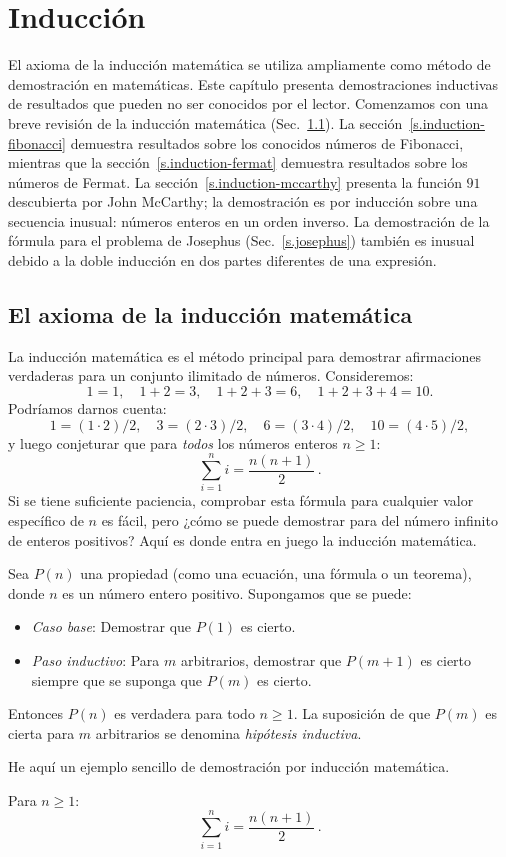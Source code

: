 
\chapter{Inducción}\label{c.induction}


El axioma de la inducción matemática se utiliza ampliamente como método de demostración en matemáticas. Este capítulo presenta demostraciones inductivas de resultados que pueden no ser conocidos por el lector. Comenzamos con una breve revisión de la inducción matemática (Sec.~\ref{s.induction-axiom}). La sección~\ref{s.induction-fibonacci} demuestra resultados sobre los conocidos números de Fibonacci, mientras que la sección~\ref{s.induction-fermat} demuestra resultados sobre los números de Fermat. La sección~\ref{s.induction-mccarthy} presenta la función $91$ descubierta por John McCarthy; la demostración es por inducción sobre una secuencia inusual: números enteros en un orden inverso. La demostración de la fórmula para el problema de Josephus (Sec.~\ref{s.josephus}) también es inusual debido a la doble inducción en dos partes diferentes de una expresión.

\section{El axioma de la inducción matemática}\label{s.induction-axiom}

La inducción matemática es el método principal para demostrar afirmaciones verdaderas para un conjunto ilimitado de números. Consideremos:
\[
1=1,\quad 1+2=3,\quad 1+2+3=6,\quad 1+2+3+4=10.
\]
Podríamos darnos cuenta:
\[
1=(1\cdot 2)/2,\quad 3=(2\cdot 3)/2,\quad  6=(3\cdot 4)/2,\quad 10=(4\cdot 5)/2,
\]
y luego conjeturar que para \emph{todos} los números enteros $n\geq 1$:
\[
\sum_{i=1}^n i = \frac{n(n+1)}{2}\,.
\]
Si se tiene suficiente paciencia, comprobar esta fórmula para cualquier valor específico de $n$ es fácil, pero ¿cómo se puede demostrar para del número infinito de enteros positivos? Aquí es donde entra en juego la inducción matemática.

\begin{axiom}
Sea $P(n)$ una propiedad (como una ecuación, una fórmula o un teorema), donde $n$ es un número entero positivo. Supongamos que se puede:
\begin{itemize}
\item \emph{Caso base}: Demostrar que $P(1)$ es cierto.
\item \emph{Paso inductivo}: Para $m$ arbitrarios, demostrar que $P(m+1)$ es cierto siempre que se suponga que $P(m)$ es cierto.
\end{itemize}
Entonces $P(n)$ es verdadera para todo $n\geq 1$.
La suposición de que $P(m)$ es cierta para $m$ arbitrarios se denomina \emph{hipótesis inductiva}.
\end{axiom}
He aquí un ejemplo sencillo de demostración por inducción matemática.
\begin{theorem}\label{t.sum}
Para $n\geq 1$:
\[
\sum_{i=1}^n i = \frac{n(n+1)}{2}\,.
\]
\end{theorem}

